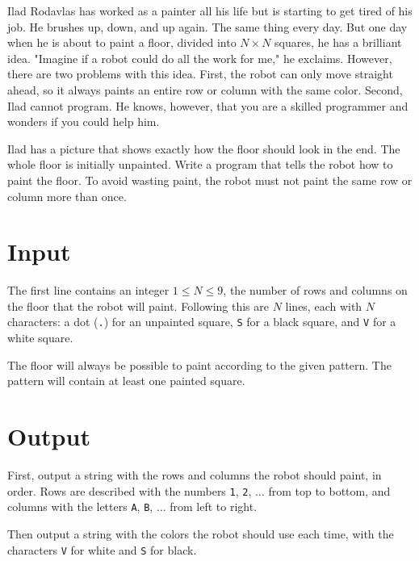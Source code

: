 \noindent
Ilad Rodavlas has worked as a painter all his life but is starting to get tired of his job.
He brushes up, down, and up again.
The same thing every day.
But one day when he is about to paint a floor, divided into $N \times N$ squares, he has a brilliant idea.
"Imagine if a robot could do all the work for me," he exclaims.
However, there are two problems with this idea.
First, the robot can only move straight ahead, so it always paints an entire row or column with the same color.
Second, Ilad cannot program.
He knows, however, that you are a skilled programmer and wonders if you could help him.

Ilad has a picture that shows exactly how the floor should look in the end.
The whole floor is initially unpainted.
Write a program that tells the robot how to paint the floor.
To avoid wasting paint, the robot must not paint the same row or column more than once.


\section*{Input}
The first line contains an integer $1 \leq N \leq 9$, the number of rows and columns on the floor that the robot will paint.
Following this are $N$ lines, each with $N$ characters: a dot (\verb|.|) for an unpainted square, \verb|S| for a black square, and \verb|V| for a white square.

The floor will always be possible to paint according to the given pattern. The pattern will contain at least one painted square.

\section*{Output}
First, output a string with the rows and columns the robot should paint, in order.
Rows are described with the numbers \verb|1|, \verb|2|, $\dots$ from top to bottom, and columns with the letters \verb|A|, \verb|B|, $\dots$ from left to right.

Then output a string with the colors the robot should use each time, with the characters \texttt{V} for white and \texttt{S} for black.

